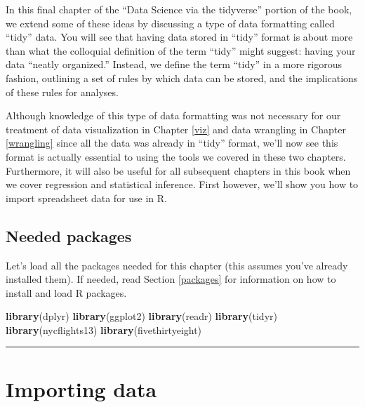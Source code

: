 \documentclass[12pt, krantz2,]{krantz}
\makeatletter
\newenvironment{Shaded}{\begin{snugshade}}{\end{snugshade}}
\newcommand{\KeywordTok}[1]{\textcolor[rgb]{0.27,0.27,0.27}{\textbf{#1}}}
\newcommand{\NormalTok}[1]{#1}
\newenvironment{kframe}{%
\medskip{}
\setlength{\fboxsep}{.8em}
 \def\at@end@of@kframe{}%
 \ifinner\ifhmode%
  \def\at@end@of@kframe{\end{minipage}}%
  \begin{minipage}{\columnwidth}%
 \fi\fi%
 \def\FrameCommand##1{\hskip\@totalleftmargin \hskip-\fboxsep
 \colorbox{shadecolor}{##1}\hskip-\fboxsep
     \hskip-\linewidth \hskip-\@totalleftmargin \hskip\columnwidth}%
 \MakeFramed {\advance\hsize-\width
   \@totalleftmargin\z@ \linewidth\hsize
   \@setminipage}}%
 {\par\unskip\endMakeFramed%
 \at@end@of@kframe}
\renewenvironment{Shaded}{\begin{kframe}}{\end{kframe}}
\makeatother
\begin{document}
In this final chapter of the ``Data Science via the tidyverse'' portion of the book, we extend some of these ideas by discussing a type of data formatting called ``tidy'' data. You will see that having data stored in ``tidy'' format is about more than what the colloquial definition of the term ``tidy'' might suggest: having your data ``neatly organized.'' Instead, we define the term ``tidy'' in a more rigorous fashion, outlining a set of rules by which data can be stored, and the implications of these rules for analyses.

Although knowledge of this type of data formatting was not necessary for our treatment of data visualization in Chapter \ref{viz} and data wrangling in Chapter \ref{wrangling} since all the data was already in ``tidy'' format, we'll now see this format is actually essential to using the tools we covered in these two chapters. Furthermore, it will also be useful for all subsequent chapters in this book when we cover regression and statistical inference. First however, we'll show you how to import spreadsheet data for use in R.

\hypertarget{needed-packages-2}{%
\subsection*{Needed packages}\label{needed-packages-2}}


Let's load all the packages needed for this chapter (this assumes you've already installed them). If needed, read Section \ref{packages} for information on how to install and load R packages.

\begin{Shaded}
\begin{Highlighting}[]
\KeywordTok{library}\NormalTok{(dplyr)}
\KeywordTok{library}\NormalTok{(ggplot2)}
\KeywordTok{library}\NormalTok{(readr)}
\KeywordTok{library}\NormalTok{(tidyr)}
\KeywordTok{library}\NormalTok{(nycflights13)}
\KeywordTok{library}\NormalTok{(fivethirtyeight)}
\end{Highlighting}
\end{Shaded}

\begin{center}\rule{0.5\linewidth}{\linethickness}\end{center}

\hypertarget{csv}{%
\section{Importing data}\label{csv}}
\end{document}

